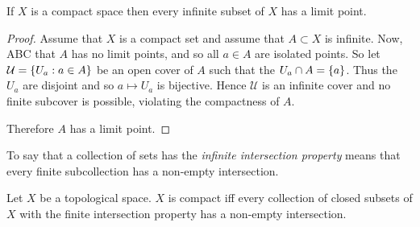 \documentclass[letterpaper,12pt,fleqn]{article}
\newcommand{\U}{\mathcal{U}}
\begin{document}
\begin{theorem}
  If \(X\) is a compact space then every infinite subset of \(X\) has a limit point.
\end{theorem}

\begin{proof}
  Assume that \(X\) is a compact set and assume that \(A\subset X\) is infinite.  Now, ABC that \(A\) has no
  limit points, and so all \(a\in A\) are isolated points.  So let \(\U=\set{U_a:a\in A}\) be an open cover of \(A\)
  such that the \(U_a\cap A=\{a\}\).  Thus the \(U_a\) are disjoint and so \(a\mapsto U_a\) is bijective.  Hence
  \(\U\) is an infinite cover and no finite subcover is possible, violating the compactness of \(A\).

  Therefore \(A\) has a limit point.
\end{proof}

\begin{definition}
  To say that a collection of sets has the \emph{infinite intersection property} means that every finite
  subcollection has a non-empty intersection.
\end{definition}

\begin{theorem}
  Let \(X\) be a topological space.  \(X\) is compact iff every collection of closed subsets of \(X\) with the
  finite intersection property has a non-empty intersection.
\end{theorem}
\end{document}
